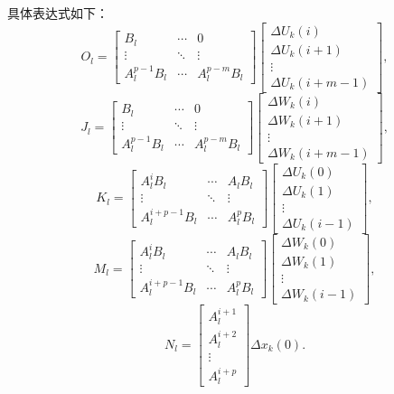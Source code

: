 具体表达式如下：
\begin{equation*}
O_l = 
\left[\begin{array}{ccc}
B_l & \cdots & 0 \\
\vdots & \ddots & \vdots \\
A_l^{p-1} B_l & \cdots & A_l^{p-m} B_l
\end{array}\right]
\left[\begin{array}{c}
\Delta U_k(i) \\
\Delta U_k(i+1) \\
\vdots \\
\Delta U_k(i+m-1)
\end{array}\right],
\end{equation*}
\begin{equation*}
J_l = 
\left[\begin{array}{ccc}
B_l & \cdots & 0 \\
\vdots & \ddots & \vdots \\
A_l^{p-1} B_l & \cdots & A_l^{p-m} B_l
\end{array}\right]
\left[\begin{array}{c}
\Delta W_k(i) \\
\Delta W_k(i+1) \\
\vdots \\
\Delta W_k(i+m-1)
\end{array}\right],
\end{equation*}
\begin{equation*}
K_l = 
\left[\begin{array}{ccc}
A_l^i B_l & \cdots & A_l B_l \\
\vdots & \ddots & \vdots \\
A_l^{i+p-1} B_l & \cdots & A_l^p B_l
\end{array}\right]
\left[\begin{array}{c}
\Delta U_k(0) \\
\Delta U_k(1) \\
\vdots \\
\Delta U_k(i-1)
\end{array}\right],
\end{equation*}
\begin{equation*}
M_l = 
\left[\begin{array}{ccc}
A_l^i B_l & \cdots & A_l B_l \\
\vdots & \ddots & \vdots \\
A_l^{i+p-1} B_l & \cdots & A_l^p B_l
\end{array}\right]
\left[\begin{array}{c}
\Delta W_k(0) \\
\Delta W_k(1) \\
\vdots \\
\Delta W_k(i-1)
\end{array}\right],
\end{equation*}
\begin{equation*}
N_l = 
\left[\begin{array}{c}
A_l^{i+1} \\
A_l^{i+2} \\
\vdots \\
A_l^{i+p}
\end{array}\right] \Delta x_k(0).
\end{equation*}

